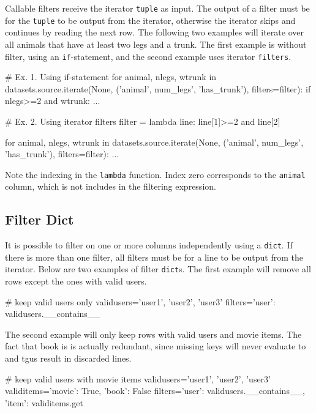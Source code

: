 Callable filters receive the iterator \texttt{tuple} as input.  The
output of a filter must be \pyTrue for the \texttt{tuple} to be output
from the iterator, otherwise the iterator skips and continues by
reading the next row.  The following two examples will iterate over
all animals that have at least two legs and a trunk.  The first
example is without filter, using an \texttt{if}-statement, and the
second example uses iterator \texttt{filters}.
\begin{python}
# Ex. 1. Using if-statement
for animal, nlegs, wtrunk in datasets.source.iterate(None,
    ('animal', num_legs', 'has_trunk'), filters=filter):
    if nlegs>=2 and wtrunk:
        ...

# Ex. 2.  Using iterator filters
filter = lambda line: line[1]>=2 and line[2]

for animal, nlegs, wtrunk in datasets.source.iterate(None,
    ('animal', num_legs', 'has_trunk'), filters=filter):
    ...
\end{python}
Note the indexing in the \texttt{lambda} function.  Index zero
corresponds to the \texttt{animal} column, which is not includes in
the filtering expression.



\subsection*{Filter Dict}

It is possible to filter on one or more columns independently using a
\texttt{dict}.  If there is more than one filter, all filters must be
\pyTrue for a line to be output from the iterator.
Below are two examples of filter \texttt{dict}s.  The first example
will remove all rows except the ones with valid users.
\begin{python}
# keep valid users only
validusers={'user1', 'user2', 'user3'}
filters={'user': validusers.__contains__}
\end{python}
The second example will only keep rows with valid users and movie
items.  The fact that book is \pyFalse is actually redundant, since
missing keys will never evaluate to \pyTrue and tgus result in
discarded lines.
\begin{python}
# keep valid users with movie items
validusers={'user1', 'user2', 'user3'}
validitems={'movie': True, 'book': False}
filters={'user': validusers.__contains__, 'item': validitems.get}
\end{python}




